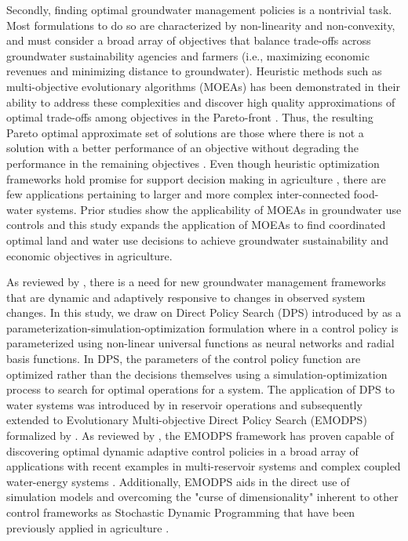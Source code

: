 \documentclass[a4paper,fleqn]{cas-sc}
\begin{document}
Secondly, finding optimal groundwater management policies is a nontrivial task. Most formulations to do so are characterized by non-linearity and non-convexity, and must consider a broad array of objectives that balance trade-offs across groundwater sustainability agencies and farmers (i.e., maximizing economic revenues and minimizing distance to groundwater). Heuristic methods such as  multi-objective evolutionary algorithms (MOEAs) has been demonstrated in their ability to address these complexities and discover high quality approximations of optimal trade-offs among objectives in the Pareto-front \citep{reed_evolutionary_2013}. Thus, the resulting Pareto optimal approximate set of solutions are those where there is not a solution with a better performance of an objective without degrading the performance in the remaining objectives \citep{coello_evolutionary_2007}. Even though heuristic optimization frameworks hold promise for support decision making in agriculture \citep{memmah_metaheuristics_2015}, there are few applications pertaining to larger and more complex inter-connected food-water systems. Prior studies show the applicability of MOEAs in groundwater use controls \citep{afshar_multi-objective_2020,salehi_shafa_multi-objective_2023,habibi_davijani_optimization_2016,mehrabi_assessment_2021,banihabib_development_2019,hesamfar_simulation-based_2023} and this study expands the application of MOEAs to find coordinated optimal land and water use decisions to achieve groundwater sustainability and economic objectives in agriculture.  

As reviewed by \citet{thomann_adaptive_2020}, there is a need for new groundwater management frameworks that are dynamic and adaptively responsive to changes in observed system changes. In this study, we draw on Direct Policy Search (DPS) introduced by \citet{rosenstein_robot_2001} as a parameterization-simulation-optimization formulation where in a control policy is parameterized using non-linear universal functions as neural networks and radial basis functions. In DPS, the parameters of the control policy function are optimized rather than the decisions themselves using a simulation-optimization process to search for optimal operations for a system. The application of DPS to water systems was introduced by \citet{koutsoyiannis_evaluation_2003} in reservoir operations and subsequently extended to Evolutionary Multi-objective Direct Policy Search (EMODPS) formalized by \citet{giuliani_universal_2014}. As reviewed by \citet{giuliani_state---art_2021}, the EMODPS framework has proven capable of discovering optimal dynamic adaptive control policies in a broad array of applications with recent examples in multi-reservoir systems \citep{macian-sorribes_inferring_2019} and complex coupled water-energy systems \citep{gupta_can_2020,doering_diagnosing_2021,hamilton_stream_2022}. Additionally, EMODPS aids in the direct use of simulation models and overcoming the "curse of dimensionality" inherent to other control frameworks as Stochastic Dynamic Programming that have been previously applied in agriculture \citep{taylor_dynamic_1993}. 
\end{document}
